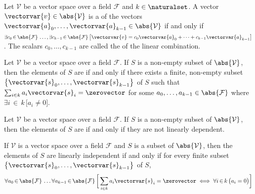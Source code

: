 \begin{dfn}
     \label{dfn:vector-space-linear-combination}
    Let \( \mathcal{V} \) be a vector space over a field \( \mathcal{F} \) and \( k \in \naturalset \).
    A vector \( \vectorvar{v} \in \abs{\mathcal{V}} \) is a  of
    the vectors \( \vectorvar{a}_0, \dots, \vectorvar{a}_{k-1} \in \abs{\mathcal{V}} \) if and only
    if \( \exists c_{0}\,{\in}\,\abs{\mathcal{F}} \, \dots, \exists c_{k-1}\,{\in}\,\abs{\mathcal{F}} \,
    \big[ \vectorvar{v} = c_{0}\vectorvar{a}_0 + \dots + c_{k-1}\vectorvar{a}_{k-1} \big] \).
    The scalars \( c_{0}, \dots, c_{k-1} \) are called the  of the linear combination.
\end{dfn}

\begin{dfn}
     \label{dfn:vector-space-linear-dependence}
    Let \( \mathcal{V} \) be a vector space over a field \( \mathcal{F} \).
    If \( S \) is a non-empty subset of \( \abs{\mathcal{V}} \), then the elements
    of \( S \) are  if and only if there exists a finite, non-empty subset
    \( \mleft\{ \vectorvar{s}_{0},\dots,\vectorvar{s}_{k-1} \mright\} \) of \( S \) such that
    \( \sum_{i \in k} a_{i}\vectorvar{s}_{i} = \zerovector \) for some
    \( a_{0},\dots,a_{k-1} \in \abs{\mathcal{F}} \) where \( \exists i\,{\in}\,k \, \big[ a_{i} \neq 0 \big] \).
\end{dfn}

\begin{dfn}
     \label{dfn:vector-space-linear-independence}
    Let \( \mathcal{V} \) be a vector space over a field \( \mathcal{F} \).
    If \( S \) is a non-empty subset of \( \abs{\mathcal{V}} \), then the elements
    of \( S \) are  if and only if they are not linearly dependent.
\end{dfn}

\begin{thm}
     \label{thm:vector-space-linearly-independent-iff-every-finite-subset-can-only-form-0-vector-with-all-0-coefficients}
    If \( \mathcal{V} \) is a vector space over a field \( \mathcal{F} \) and \( S \) is a subset of \( \abs{\mathcal{V}} \), then the
    elements of \( S \) are linearly independent if and only if for every finite subset
    \( \mleft\{ \vectorvar{s}_{0}, \dots, \vectorvar{s}_{k-1} \mright\} \) of \( S \),
    \begin{equation*}
        \forall a_{0}\,{\in}\,\abs{\mathcal{F}} \, \dots \forall a_{k-1}\,{\in}\,\abs{\mathcal{F}} \,
        \bigg[ \sum_{i \in k} a_{i}\vectorvar{s}_{i} = \zerovector \iff \forall i\,{\in}\,k \, \big( a_{i} = 0 \big) \bigg]
    \end{equation*}
\end{thm}

